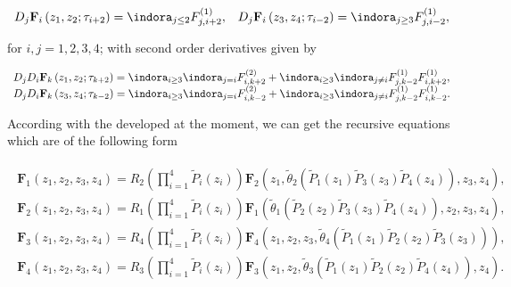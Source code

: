 \begin{eqnarray}\label{Ec.Gral.Primer.Momento.Ind.Exh}
\begin{array}{ll}
D_{j}\mathbf{F}_{i}\left(z_{1},z_{2};\tau_{i+2}\right)=\indora_{j\leq2}F_{j,i+2}^{(1)},&
D_{j}\mathbf{F}_{i}\left(z_{3},z_{4};\tau_{i-2}\right)=\indora_{j\geq3}F_{j,i-2}^{(1)},
\end{array}
\end{eqnarray}

for $i,j=1,2,3,4$; with second order derivatives given by

\begin{eqnarray}\label{Ec.Gral.Segundo.Momento.Ind.Exh}
\begin{array}{l}
D_{j}D_{i}\mathbf{F}_{k}\left(z_{1},z_{2};\tau_{k+2}\right)=\indora_{i\geq3}\indora_{j=i}F_{i,k+2}^{(2)}+\indora_{i\geq 3}\indora_{j\neq i}F_{j,k-2}^{(1)}F_{i,k+2}^{(1)},\\
D_{j}D_{i}\mathbf{F}_{k}\left(z_{3},z_{4};\tau_{k-2}\right)=\indora_{i\geq3}\indora_{j=i}F_{i,k-2}^{(2)}+\indora_{i\geq 3}\indora_{j\neq i}F_{j,k-2}^{(1)}F_{i,k-2}^{(1)}.
\end{array}
\end{eqnarray}


 According with the developed at the moment, we can get the recursive equations which are of the following form

\begin{eqnarray}\label{General.System.Double.Transfer}
\begin{array}{l}
\mathbf{F}_{1}\left(z_{1},z_{2},z_{3},z_{4}\right)=R_{2}\left(\prod_{i=1}^{4}\tilde{P}_{i}\left(z_{i}
\right)\right)\mathbf{F}_{2}\left(z_{1},\tilde{\theta}_{2}\left(\tilde{P}_{1}\left(z_{1}\right)\tilde{P}_{3}\left(z_{3}\right)\tilde{P}_{4}
\left(z_{4}\right)\right),z_{3},z_{4}\right),\\
\mathbf{F}_{2}\left(z_{1},z_{2},z_{3},z_{4}\right)=R_{1}\left(\prod_{i=1}^{4}\tilde{P}_{i}\left(z_{i}
\right)\right)
\mathbf{F}_{1}\left(\tilde{\theta}_{1}\left(\tilde{P}_{2}\left(z_{2}\right)\tilde{P}_{3}\left(z_{3}
\right)\tilde{P}_{4}\left(z_{4}\right)\right),z_{2},z_{3},z_{4}\right),\\
\mathbf{F}_{3}\left(z_{1},z_{2},z_{3},z_{4}\right)=R_{4}\left(\prod_{i=1}^{4}\tilde{P}_{i}\left(z_{i}
\right)\right)\mathbf{F}_{4}\left(z_{1},z_{2},z_{3},\tilde{\theta}_{4}\left(\tilde{P}_{1}\left(z_{1}\right)\tilde{P}_{2}\left(z_{2}\right)\tilde{P}_{3}\left(z_{3}\right)
\right)\right),\\
\mathbf{F}_{4}\left(z_{1},z_{2},z_{3},z_{4}\right)=R_{3}\left(\prod_{i=1}^{4}\tilde{P}_{i}\left(z_{i}
\right)\right)
\mathbf{F}_{3}\left(z_{1},z_{2},\tilde{\theta}_{3}\left(\tilde{P}_{1}\left(z_{1}\right)\tilde{P}_{2}\left(z_{2}\right)\tilde{P}_{4}
\left(z_{4}\right)\right),z_{4}\right).
\end{array}
\end{eqnarray}
%
%


